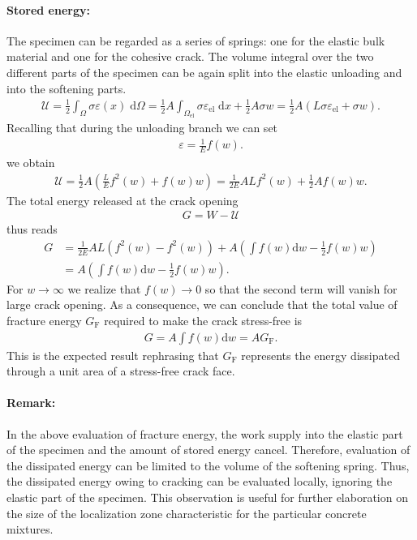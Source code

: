 \documentclass[main.tex]{subfiles}
\begin{document}
\paragraph{Stored energy:} The specimen can be regarded as a series of springs: one for the elastic bulk material and one for the cohesive crack. The volume integral over the two different parts of the specimen can be again split into the elastic unloading and into the softening parts.
\begin{align}
\mathcal{U} = 
\frac{1}{2} 
\int_\Omega \sigma \varepsilon(x) \; \mathrm{d}\Omega
=
\frac{1}{2} 
A
\int_{\Omega_\mathrm{el}}
\sigma \varepsilon_\mathrm{el}
\; \mathrm{d} x
+
\frac{1}{2} 
A
\sigma w 
=
\frac{1}{2} 
A 
\left(
L
\sigma \varepsilon_\mathrm{el}
+
\sigma w 
\right).
\end{align}
Recalling that during the unloading branch we can set
\begin{align}
\varepsilon = \frac{1}{E} f(w).
\end{align}
we obtain
\begin{align}
\mathcal{U} = 
\frac{1}{2} A 
\left(  
\frac{L }{E} 
  f^2(w) 
+ f(w) w 
\right)
= 
\frac{1}{2E} A  L
  f^2(w) 
+ 
\frac{1}{2} A 
 f(w) w.
\end{align}
The total energy released at the crack opening 
\begin{align}
G = W - \mathcal{U}
\end{align}
thus reads
\begin{align}
G &= \frac{1}{2E} AL\left( f^2(w) - f^2(w) \right) +
 A\left(  \int f(w) \mathrm{d}w -  \frac{1}{2} f(w) w  \right)
 \\ \nonumber
&=
 A\left(  \int f(w) \mathrm{d}w -  \frac{1}{2} f(w) w  \right).
\end{align}
For $w \rightarrow \infty$ we realize that $f(w) \rightarrow 0$  so that the second term will vanish for large crack opening. As a consequence, we can conclude that the total value of fracture energy $G_\mathrm{F}$ required to make the crack stress-free is
\begin{align}
G = 
 A  \int f(w) \mathrm{d}w  
=
 A   G_\mathrm{F}.
\end{align}
This is the expected result rephrasing that  $G_\mathrm{F}$ represents the energy dissipated through a unit area of a stress-free crack face.

\paragraph{Remark:} In the above evaluation of fracture energy, the work supply into the elastic part of the specimen and the amount of stored energy cancel. Therefore, evaluation of the dissipated energy can be limited to the volume of the softening spring. Thus, the dissipated energy owing to cracking can be evaluated locally, ignoring the elastic part of the specimen. This observation is useful for further elaboration on the size of the localization zone characteristic for the particular concrete mixtures.
\end{document}
